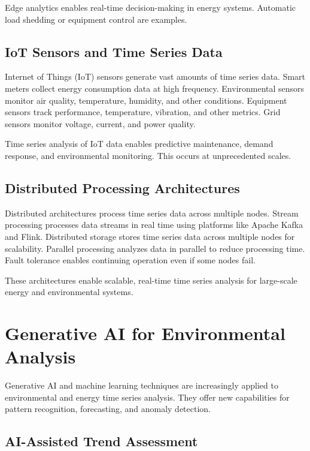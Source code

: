 Edge analytics enables real-time decision-making in energy systems. Automatic load shedding or equipment control are examples.

\subsection{IoT Sensors and Time Series Data}

Internet of Things (IoT) sensors generate vast amounts of time series data. Smart meters collect energy consumption data at high frequency. Environmental sensors monitor air quality, temperature, humidity, and other conditions. Equipment sensors track performance, temperature, vibration, and other metrics. Grid sensors monitor voltage, current, and power quality.

Time series analysis of IoT data enables predictive maintenance, demand response, and environmental monitoring. This occurs at unprecedented scales.

\subsection{Distributed Processing Architectures}

Distributed architectures process time series data across multiple nodes. Stream processing processes data streams in real time using platforms like Apache Kafka and Flink. Distributed storage stores time series data across multiple nodes for scalability. Parallel processing analyzes data in parallel to reduce processing time. Fault tolerance enables continuing operation even if some nodes fail.

These architectures enable scalable, real-time time series analysis for large-scale energy and environmental systems.

\section{Generative AI for Environmental Analysis}

Generative AI and machine learning techniques are increasingly applied to environmental and energy time series analysis. They offer new capabilities for pattern recognition, forecasting, and anomaly detection.

\subsection{AI-Assisted Trend Assessment}

